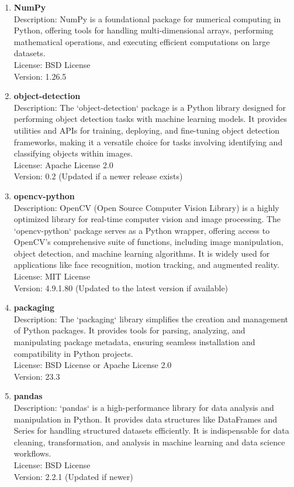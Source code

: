 \begin{enumerate}
	\item \textbf{NumPy} \\
	Description: NumPy is a foundational package for numerical computing in Python, offering tools for handling multi-dimensional arrays, performing mathematical operations, and executing efficient computations on large datasets. \\
	License: BSD License \\
	Version: 1.26.5



	\item \textbf{object-detection} \\
	Description: The `object-detection` package is a Python library designed for performing object detection tasks with machine learning models. It provides utilities and APIs for training, deploying, and fine-tuning object detection frameworks, making it a versatile choice for tasks involving identifying and classifying objects within images. \\
	License: Apache License 2.0 \\
	Version: 0.2 (Updated if a newer release exists)
	
	\item \textbf{opencv-python} \\
	Description: OpenCV (Open Source Computer Vision Library) is a highly optimized library for real-time computer vision and image processing. The `opencv-python` package serves as a Python wrapper, offering access to OpenCV’s comprehensive suite of functions, including image manipulation, object detection, and machine learning algorithms. It is widely used for applications like face recognition, motion tracking, and augmented reality. \\
	License: MIT License \\
	Version: 4.9.1.80 (Updated to the latest version if available)
	
	\item \textbf{packaging} \\
	Description: The `packaging` library simplifies the creation and management of Python packages. It provides tools for parsing, analyzing, and manipulating package metadata, ensuring seamless installation and compatibility in Python projects. \\
	License: BSD License or Apache License 2.0 \\
	Version: 23.3
	
	\item \textbf{pandas} \\
	Description: `pandas` is a high-performance library for data analysis and manipulation in Python. It provides data structures like DataFrames and Series for handling structured datasets efficiently. It is indispensable for data cleaning, transformation, and analysis in machine learning and data science workflows. \\
	License: BSD License \\
	Version: 2.2.1 (Updated if newer)
	

\end{enumerate}
